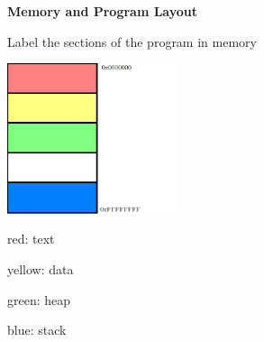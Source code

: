 \textbf{Memory and Program Layout}

Label the sections of the program in memory

\includegraphics[width=50mm]{questions/programstructure.png}

\begin{answer}
red: text

yellow: data

green: heap

blue: stack
\end{answer}